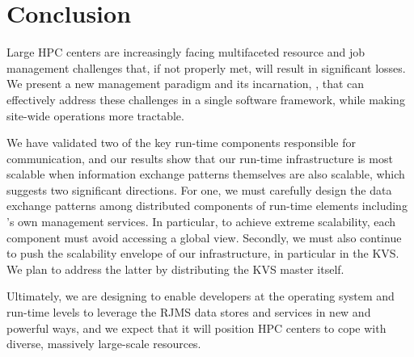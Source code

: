 \section{Conclusion}
Large HPC centers are increasingly facing 
multifaceted resource and job management challenges
that, if not properly met, will result 
in significant losses.  
We present a new management paradigm and its incarnation, \flux, that can effectively
address these challenges in a single software framework,
while making site-wide operations more tractable.

We have validated two of the key run-time components responsible for communication,
and our results show that our run-time 
infrastructure is most scalable when information 
exchange patterns themselves are also scalable, which suggests two significant directions. 
For one, we must carefully design the data exchange patterns
among distributed components of run-time elements including \flux's own management services. 
In particular, to achieve extreme scalability, each component 
must avoid accessing a global view.
Secondly, we must also continue to push the 
scalability envelope of our infrastructure, in particular in the
KVS. We plan to address the latter by 
distributing the KVS master itself.
%

Ultimately, we are designing \flux to  
enable developers at the operating system and
run-time levels to leverage the RJMS data stores and services in
new and powerful ways, and we expect that it will position HPC centers to cope
with diverse, massively large-scale resources.

